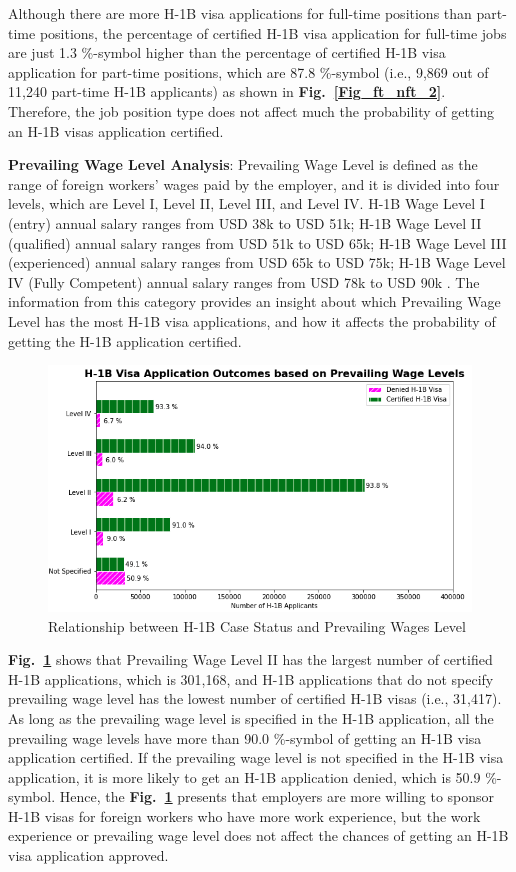 \documentclass[conference]{IEEEtran}
\begin{document}
Although there are more H-1B visa applications for full-time positions than part-time positions, the percentage of certified H-1B visa application for full-time jobs are just 1.3 \%-symbol higher than the percentage of certified H-1B visa application for part-time positions, which are 87.8 \%-symbol (i.e., 9,869 out of 11,240 part-time H-1B applicants) as shown in \textbf{Fig.~\ref{Fig_ft_nft_2}}. Therefore, the job position type does not affect much the probability of getting an H-1B visas application certified.

\textbf{Prevailing Wage Level Analysis}: Prevailing Wage Level is defined as the range of foreign workers' wages paid by the employer, and it is divided into four levels, which are Level I, Level II, Level III, and Level IV. H-1B Wage Level I (entry) annual salary ranges from USD 38k to USD 51k; H-1B Wage Level II (qualified) annual salary ranges from USD 51k to USD 65k; H-1B Wage Level III (experienced) annual salary ranges from USD 65k to USD 75k; H-1B Wage Level IV (Fully Competent) annual salary ranges from USD 78k to USD 90k \cite{b7}. The information from this category provides an insight about which Prevailing Wage Level has the most H-1B visa applications, and how it affects the probability of getting the H-1B application certified.

\begin{figure}[htbp]
\centerline{\includegraphics[scale = 0.3]{PWL.png}}
\caption{Relationship between H-1B Case Status and Prevailing Wages Level}
\label{fig_pwl}
\end{figure}

\textbf{Fig.~\ref{fig_pwl}} shows that Prevailing Wage Level II has the largest number of certified H-1B applications, which is 301,168, and H-1B applications that do not specify prevailing wage level has the lowest number of certified H-1B visas (i.e., 31,417). As long as the prevailing wage level is specified in the H-1B application, all the prevailing wage levels have more than 90.0 \%-symbol of getting an H-1B visa application certified. If the prevailing wage level is not specified in the H-1B visa application, it is more likely to get an H-1B application denied, which is 50.9 \%-symbol. Hence, the \textbf{Fig.~\ref{fig_pwl}} presents that employers are more willing to sponsor H-1B visas for foreign workers who have more work experience, but the work experience or prevailing wage level does not affect the chances of getting an H-1B visa application approved.
\end{document}
